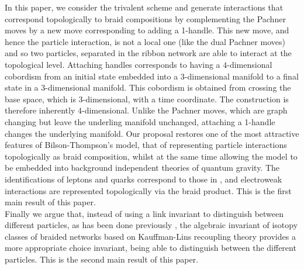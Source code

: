 \documentclass[aps,nofootinbib,amsfonts,superscriptaddress]{revtex4}
\begin{document}
In this paper, we consider the trivalent scheme and generate interactions that correspond topologically to braid compositions by complementing the Pachner moves by a new move corresponding to adding a 1-handle. This new move, and hence the particle interaction, is not a local one (like the dual Pachner moves) and so two particles, separated in the ribbon network are able to interact at the topological level. Attaching handles corresponds to having a $4$-dimensional cobordism from an initial state embedded into a $3$-dimensional manifold to a final state in a $3$-dimensional manifold. This cobordism is obtained from crossing the base space, which is $3$-dimensional, with a time coordinate. The construction is therefore inherently $4$-dimensional. Unlike the Pachner moves, which are graph changing but leave the underling manifold unchanged, attaching a 1-handle changes the underlying manifold. Our proposal restores one of the most attractive features of Bilson-Thompson's model, that of representing particle interactions topologically as braid composition, whilst at the same time allowing the model to be embedded into background independent theories of quantum gravity. The identifications of leptons and quarks correspond to those in \cite{BT}, and electroweak interactions are represented topologically via the braid product. This is the first main result of this paper. \\

Finally we argue that, instead of using a link invariant to distinguish between different particles, as has been done previously \cite{BT2}, the algebraic invariant of isotopy classes of braided networks based on Kauffman-Lins recoupling theory \cite{KL} provides a more appropriate choice invariant, being able to distinguish between the different particles. This is the second main result of this paper. \\


\end{document}
